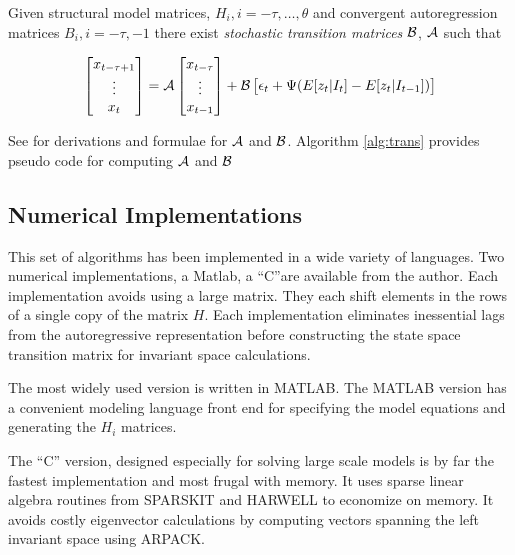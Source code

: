 \documentclass[12pt]{elsart}
\begin{document}
Given structural model matrices, $H_i, i=-\tau,\ldots,\theta$ 
and 
 convergent autoregression matrices $B_i,i=-\tau,-1$
there exist  
{\em stochastic transition
matrices\/} $\mathcal{B}$, $\mathcal{A}$ such that




  

\begin{gather}
\begin{bmatrix}
 x_{t-\tau+1}\\\vdots\\x_{t}
\end{bmatrix}= 
\sTransA%
\begin{bmatrix}
 x_{t-\tau}\\\vdots\\x_{t-1}
\end{bmatrix} +
\sTransB%
\begin{bmatrix}\epsilon_{t} +
\Psi  (E[z_t|I_t]-E[z_t|I_{t-1}])
\end{bmatrix}
\end{gather}


See \cite{anderson10} for  derivations and formulae for $\mathcal{A}$
and $\mathcal{B}$.
Algorithm \ref{alg:trans} provides pseudo code for computing $\mathcal{A}$ and $\mathcal{B}$




\subsection{Numerical Implementations}
\label{sec:imple}

This set of algorithms has been implemented in a wide variety of languages.
Two numerical implementations, a  Matlab, a ``C''are available from the author. %
Each implementation avoids using a large matrix.
They each  shift elements in the
rows of a single copy of the matrix $H$. 
Each implementation
eliminates inessential lags from the autoregressive representation before
constructing the state space transition matrix for invariant space 
calculations.  



The most widely used version is written in MATLAB. The MATLAB version
has a convenient modeling language front end for specifying the model
equations and generating the $H_i$ matrices. 

The ``C'' version, designed especially for solving large scale
models is by far the fastest implementation and most frugal with memory.
It uses sparse linear algebra routines from SPARSKIT\cite{saad94} and
HARWELL\cite{nag95} to economize on
memory. It avoids costly eigenvector calculations by
computing vectors spanning the left invariant space using ARPACK\cite{lehoucq96}.
\end{document}
